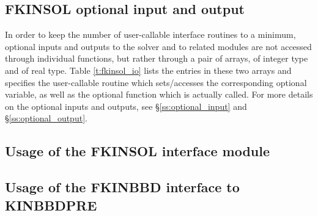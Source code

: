 \subsection{FKINSOL optional input and output}

In order to keep the number of user-callable {\fkinsol} interface routines to
a minimum, optional inputs and outputs to the {\kinsol} solver and to related 
modules are not accessed through individual functions, but rather through a
pair of arrays,  of integer type and  of real type.
Table \ref{t:fkinsol_io} lists the entries in these two arrays and specifies the
{\fkinsol} user-callable routine which sets/accesses the corresponding optional
variable, as well as the {\kinsol} optional function which is actually called.
For more details on the optional inputs and outputs, see \S\ref{ss:optional_input}
and \S\ref{ss:optional_output}.

\subsection{Usage of the FKINSOL interface module}\label{ss:fkinsol_usage}

\subsection{Usage of the FKINBBD interface to KINBBDPRE}
